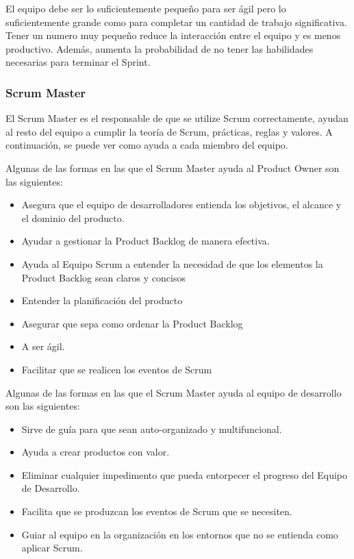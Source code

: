 El equipo debe ser lo suficientemente pequeño para ser ágil pero lo suficientemente grande como para completar 
un cantidad de trabajo significativa. Tener un numero muy pequeño reduce la interacción entre el equipo y es 
menos productivo. Además, aumenta la probabilidad de no tener las habilidades necesarias para terminar el 
Sprint.

\subsubsection{Scrum Master}

El Scrum Master es el responsable de que se utilize Scrum correctamente, ayudan al resto del equipo a cumplir 
la teoría de Scrum, prácticas, reglas y valores. A continuación, se puede ver como ayuda a cada miembro del 
equipo.

Algunas de las formas en las que el Scrum Master ayuda al Product Owner son las siguientes:
\begin{itemize}
	\item Asegura que el equipo de desarrolladores entienda los objetivos, el alcance y el dominio del producto.
	\item Ayudar a gestionar la Product Backlog de manera efectiva.
	\item Ayuda al Equipo Scrum a entender la necesidad de que los elementos la Product Backlog sean claros y 
	concisos
	\item Entender la planificación del producto
	\item Asegurar que sepa como ordenar la Product Backlog
	\item A ser ágil.
	\item Facilitar que se realicen los eventos de Scrum
 \end{itemize}

Algunas de las formas en las que el Scrum Master ayuda al equipo de desarrollo son las siguientes:
\begin{itemize}
	\item Sirve de guía para que sean auto-organizado y multifuncional.
	\item Ayuda a crear productos con valor.
	\item Eliminar cualquier impedimento que pueda entorpecer el progreso del Equipo de Desarrollo.
	\item Facilita que se produzcan los eventos de Scrum que se necesiten.
	\item Guiar al equipo en la organización en los entornos que no se entienda como aplicar Scrum.
\end{itemize}

